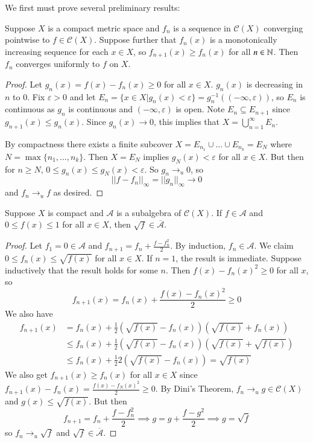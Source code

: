 We first must prove several preliminary results:

\begin{namthm}
    Suppose $X$ is a compact metric space and $f_n$ is a sequence in $\mathcal{C}(X)$ converging pointwise to $f \in \mathcal{C}(X)$. Suppose further that $f_n(x)$ is a monotonically increasing sequence for each $x \in X$, so $f_{n+1}(x) \geq f_n(x)$ for all $n \in \mathbb N$. Then $f_n$ converges uniformly to $f$ on $X$.
\end{namthm}
\begin{proof}
    Let $g_n(x) = f(x) - f_n(x) \geq 0$ for all $x \in X$. $g_n(x)$ is decreasing in $n$ to $0$. Fix $\varepsilon > 0$ and let $E_n = \{x \in X\vert g_n(x) < \varepsilon\} = g_n^{-1}((-\infty,\varepsilon))$, so $E_n$ is continuous as $g_n$ is continuous and $(-\infty,\varepsilon)$ is open. Note $E_n \subseteq E_{n+1}$ since $g_{n+1}(x) \leq g_n(x)$. Since $g_n(x)\rightarrow 0$, this implies that $X = \bigcup_{n=1}^{\infty}E_n$. 

    By compactness there exists a finite subcover $X = E_{n_1}\cup...\cup E_{n_k} = E_N$ where $N = \max\{n_1,...,n_k\}$. Then $X = E_N$ implies $g_N(x) < \varepsilon$ for all $x \in X$. But then for $n \geq N$, $0 \leq g_n(x) \leq g_N(x) < \varepsilon$. So $g_n\rightarrow_u 0$, so $$||f-f_n||_{\infty}=||g_n||_{\infty}\rightarrow 0$$ and $f_n\rightarrow_uf$ as desired.
\end{proof}

\begin{lem}
    Suppose $X$ is compact and $\mathcal{A}$ is a subalgebra of $\mathcal{C}(X)$. If $f \in \mathcal{A}$ and $0 \leq f(x) \leq 1$ for all $x \in X$, then $\sqrt{f} \in \overline{\mathcal{A}}$. 
\end{lem}
\begin{proof}
    Let $f_1 = 0 \in \mathcal{A}$ and $f_{n+1} = f_n + \frac{f-f_n^2}{2}$. By induction, $f_n \in \mathcal{A}$. We claim $0 \leq f_n(x) \leq \sqrt{f(x)}$ for all $x \in X$. If $n = 1$, the result is immediate. Suppose inductively that the result holds for some $n$. Then $f(x) - f_n(x)^2 \geq 0$ for all $x$, so $$f_{n+1}(x) = f_n(x) + \frac{f(x) - f_n(x)^2}{2} \geq 0$$ We also have \begin{align*}
        f_{n+1}(x) &= f_n(x)+\frac{1}{2}(\sqrt{f(x)}-f_n(x))(\sqrt{f(x)}+f_n(x)) \\
        &\leq f_n(x) + \frac{1}{2}(\sqrt{f(x)} - f_n(x))(\sqrt{f(x)} + \sqrt{f(x)}) \\
        &\leq f_n(x) + \frac{1}{2}2(\sqrt{f(x)}-f_n(x)) = \sqrt{f(x)}
    \end{align*}
    We also get $f_{n+1}(x) \geq f_n(x)$ for all $x \in X$ since $f_{n+1}(x) - f_n(x) = \frac{f(x) - f_N(x)^2}{2} \geq 0$. By Dini's Theorem, $f_n\rightarrow_ug \in \mathcal{C}(X)$ and $g(x) \leq \sqrt{f(x)}$. But then $$f_{n+1}=f_n + \frac{f-f_n^2}{2} \implies g = g + \frac{f-g^2}{2} \implies g = \sqrt{f}$$ so $f_n\rightarrow_u\sqrt{f}$ and $\sqrt{f} \in \overline{\mathcal{A}}$.
\end{proof}

